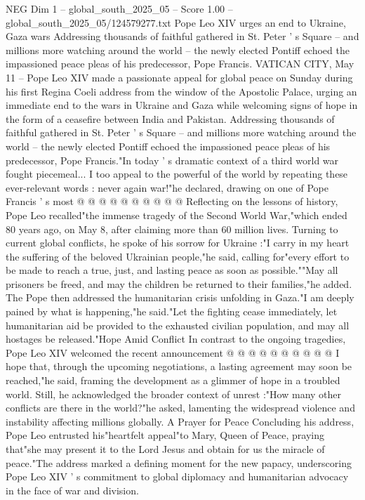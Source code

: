 \begin{textsample}{NEG Dim 1 – global\_south\_2025\_05 – Score 1.00 – global\_south\_2025\_05/124579277.txt}  \label{ex:f1_neg_174}
Pope Leo XIV urges an end to Ukraine, Gaza wars Addressing thousands of faithful gathered in St.
Peter ' s Square -- and millions more watching around the world -- the newly elected Pontiff echoed the impassioned peace pleas of his predecessor, Pope Francis.
VATICAN CITY, May 11 -- Pope Leo XIV made a passionate appeal for global peace on Sunday during his first Regina Coeli address from the window of the Apostolic Palace, urging an immediate end to the wars in Ukraine and Gaza while welcoming signs of hope in the form of a ceasefire between India and Pakistan.
Addressing thousands of faithful gathered in St.
Peter ' s Square -- and millions more watching around the world -- the newly elected Pontiff echoed the impassioned peace pleas of his predecessor, Pope Francis."In today ' s dramatic context of a third world war fought piecemeal...
I too appeal to the powerful of the world by repeating these ever-relevant words : never again war!"he declared, drawing on one of Pope Francis ' s most @ @ @ @ @ @ @ @ @ @ Reflecting on the lessons of history, Pope Leo recalled"the immense tragedy of the Second World War,"which ended 80 years ago, on May 8, after claiming more than 60 million lives.
Turning to current global conflicts, he spoke of his sorrow for Ukraine :"I carry in my heart the suffering of the beloved Ukrainian people,"he said, calling for"every effort to be made to reach a true, just, and lasting peace as soon as possible.""May all prisoners be freed, and may the children be returned to their families,"he added.
The Pope then addressed the humanitarian crisis unfolding in Gaza."I am deeply pained by what is happening,"he said."Let the fighting cease immediately, let humanitarian aid be provided to the exhausted civilian population, and may all hostages be released."Hope Amid Conflict In contrast to the ongoing tragedies, Pope Leo XIV welcomed the recent announcement @ @ @ @ @ @ @ @ @ @ I hope that, through the upcoming negotiations, a lasting agreement may soon be reached,"he said, framing the development as a glimmer of hope in a troubled world.
Still, he acknowledged the broader context of unrest :"How many other conflicts are there in the world?"he asked, lamenting the widespread violence and instability affecting millions globally.
A Prayer for Peace Concluding his address, Pope Leo entrusted his"heartfelt appeal"to Mary, Queen of Peace, praying that"she may present it to the Lord Jesus and obtain for us the miracle of peace."The address marked a defining moment for the new papacy, underscoring Pope Leo XIV ' s commitment to global diplomacy and humanitarian advocacy in the face of war and division.

\end{textsample}
